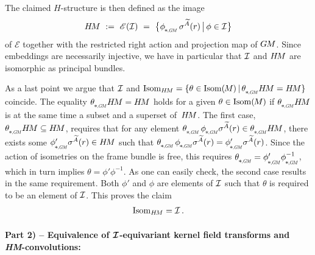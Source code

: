 The claimed $H$-structure is then defined as the image
\begin{align}
    \HM\ :=\ \mathscr{E}(\I)\ =\ \big\{ \dphiGM\, \sigma^{\widetilde{A}}(r) \,\big|\, \phi \in \I \big\}
\end{align}
of $\mathscr{E}$ together with the restricted right action and projection map of $G\mkern-1.4muM$.
Since embeddings are necessarily injective, we have in particular that $\mathcal{I}$ and $H\mkern-2.5muM$ are isomorphic as principal bundles.


As a last point we argue that $\mathcal{I}$ and $\IsomHM = \{ \theta \in \IsomM \,|\, \dthetaGM \HM = \HM \}$ coincide.
The equality $\dthetaGM \HM = \HM$ holds for a given $\theta \in \operatorname{Isom}(\mkern-1.5mu M \mkern-.5mu)$ if $\dthetaGM \HM$ is at the same time a subset and a superset of~$H\mkern-2.5muM$.
The first case, $\dthetaGM \HM \subseteq \HM$, requires that for any element $\dthetaGM\, \dphiGM \sigma^{\widetilde{A}}(r) \in \dthetaGM \HM$, there exists some $\dphiGM' \sigma^{\widetilde{A}}(r) \in \HM$ such that $\dthetaGM\, \dphiGM \sigma^{\widetilde{A}}(r) = \dphiGM' \sigma^{\widetilde{A}}(r)$.
Since the action of isometries on the frame bundle is free, this requires $\dthetaGM = \dphiGM' \dphiGM^{-1}$, which in turn implies $\theta = \phi' \phi^{-1}$.
As one can easily check, the second case results in the same requirement.
Both $\phi'$ and $\phi$ are elements of $\mathcal{I}$ such that $\theta$ is required to be an element of $\mathcal{I}$.
This proves the claim
\begin{align}\label{eq:IsomHM_I}
    \operatorname{Isom}_{H\mkern-2.5muM} = \mathcal{I} \,.
\end{align}














\paragraph{Part 2) -- Equivalence of $\bm{\mathcal{I}}$-equivariant kernel field transforms and \textit{HM}-convolutions:}

